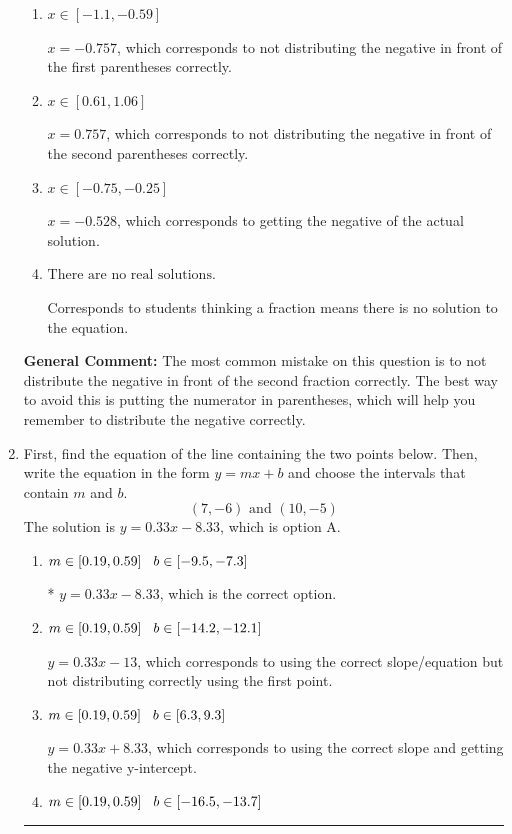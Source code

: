 \documentclass{extbook}[14pt]
\newcommand{\litem}[1]{\item #1

\rule{\textwidth}{0.4pt}}
\begin{document}
\begin{enumerate}
{\begin{enumerate}[label=\Alph*.]
* $x = -1.405$, which is the correct option.
\item \( x \in [-1.1, -0.59] \)

$x = -0.757$, which corresponds to not distributing the negative in front of the first parentheses correctly.
\item \( x \in [0.61, 1.06] \)

$x = 0.757$, which corresponds to not distributing the negative in front of the second parentheses correctly.
\item \( x \in [-0.75, -0.25] \)

$x = -0.528$, which corresponds to getting the negative of the actual solution.
\item \( \text{There are no real solutions.} \)

Corresponds to students thinking a fraction means there is no solution to the equation.
\end{enumerate}

\textbf{General Comment:} The most common mistake on this question is to not distribute the negative in front of the second fraction correctly. The best way to avoid this is putting the numerator in parentheses, which will help you remember to distribute the negative correctly.
}
\litem{
First, find the equation of the line containing the two points below. Then, write the equation in the form $ y=mx+b $ and choose the intervals that contain $m$ and $b$.
\[ (7, -6) \text{ and } (10, -5) \]The solution is \( y = 0.33x -8.33 \), which is option A.\begin{enumerate}[label=\Alph*.]
\item \( m \in [0.19, 0.59] \hspace*{3mm} b \in [-9.5, -7.3] \)

* $y = 0.33x -8.33$, which is the correct option.
\item \( m \in [0.19, 0.59] \hspace*{3mm} b \in [-14.2, -12.1] \)

 $y = 0.33x -13$, which corresponds to using the correct slope/equation but not distributing correctly using the first point.
\item \( m \in [0.19, 0.59] \hspace*{3mm} b \in [6.3, 9.3] \)

 $y = 0.33x + 8.33$, which corresponds to using the correct slope and getting the negative y-intercept.
\item \( m \in [0.19, 0.59] \hspace*{3mm} b \in [-16.5, -13.7] \)


\end{enumerate}}
\end{enumerate}
\end{document}

